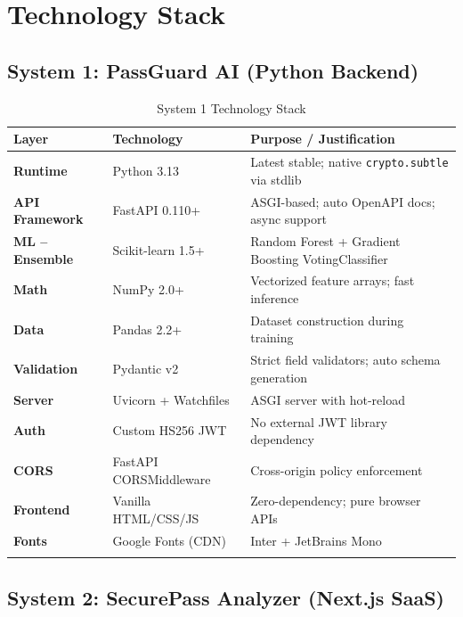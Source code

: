 \documentclass[12pt,a4paper]{article}
\begin{document}
\section{Technology Stack}

\subsection{System 1: PassGuard AI (Python Backend)}

\begin{longtable}{>{\bfseries}p{3.2cm} p{3.5cm} p{6cm}}
\toprule
\textbf{Layer} & \textbf{Technology} & \textbf{Purpose / Justification} \\
\midrule
\endhead

Runtime         & Python 3.13            & Latest stable; native \texttt{crypto.subtle} via stdlib \\
API Framework   & FastAPI 0.110+         & ASGI-based; auto OpenAPI docs; async support \\
ML -- Ensemble  & Scikit-learn 1.5+      & Random Forest + Gradient Boosting VotingClassifier \\
Math            & NumPy 2.0+             & Vectorized feature arrays; fast inference \\
Data            & Pandas 2.2+            & Dataset construction during training \\
Validation      & Pydantic v2            & Strict field validators; auto schema generation \\
Server          & Uvicorn + Watchfiles   & ASGI server with hot-reload \\
Auth            & Custom HS256 JWT       & No external JWT library dependency \\
CORS            & FastAPI CORSMiddleware  & Cross-origin policy enforcement \\
Frontend        & Vanilla HTML/CSS/JS    & Zero-dependency; pure browser APIs \\
Fonts           & Google Fonts (CDN)     & Inter + JetBrains Mono \\

\bottomrule
\caption{System 1 Technology Stack}
\end{longtable}

\subsection{System 2: SecurePass Analyzer (Next.js SaaS)}
\end{document}
